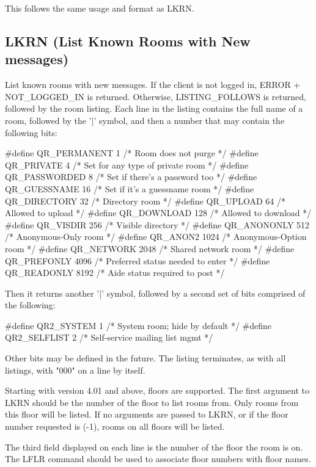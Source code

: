  This follows the same usage and format as LKRN.



\subsection{LKRN (List Known Rooms with New messages)}

 List known rooms with new messages.  If the client is not logged in, ERROR +
NOT_LOGGED_IN is returned.  Otherwise, LISTING_FOLLOWS is returned, followed
by the room listing.  Each line in the listing contains the full name of a
room, followed by the '|' symbol, and then a number that may contain the
following bits:

\#define QR_PERMANENT	1		/* Room does not purge              */
\#define QR_PRIVATE	4		/* Set for any type of private room */
\#define QR_PASSWORDED	8		/* Set if there's a password too    */
\#define QR_GUESSNAME	16		/* Set if it's a guessname room     */
\#define QR_DIRECTORY	32		/* Directory room                   */
\#define QR_UPLOAD	64		/* Allowed to upload                */
\#define QR_DOWNLOAD	128		/* Allowed to download              */
\#define QR_VISDIR	256		/* Visible directory                */
\#define QR_ANONONLY	512		/* Anonymous-Only room              */
\#define QR_ANON2	1024		/* Anonymous-Option room            */
\#define QR_NETWORK	2048		/* Shared network room              */
\#define QR_PREFONLY	4096		/* Preferred status needed to enter */
\#define QR_READONLY	8192		/* Aide status required to post     */

 Then it returns another '|' symbol, followed by a second set of bits comprised
of the following:

\#define QR2_SYSTEM	1		/* System room; hide by default     */
\#define QR2_SELFLIST	2		/* Self-service mailing list mgmt   */

 Other bits may be defined in the future.  The listing terminates, as with
all listings, with "000" on a line by itself.

 Starting with version 4.01 and above, floors are supported.  The first
argument to LKRN should be the number of the floor to list rooms from.  Only
rooms from this floor will be listed.  If no arguments are passed to LKRN, or
if the floor number requested is (-1), rooms on all floors will be listed.

 The third field displayed on each line is the number of the floor the room
is on.  The LFLR command should be used to associate floor numbers with
floor names.

